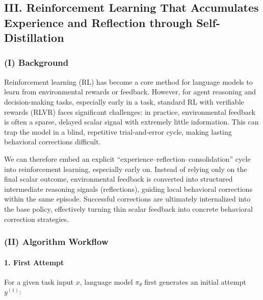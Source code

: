 \hypertarget{iii.-reinforcement-learning-that-accumulates-experience-and-reflection-through-self-distillation}{%
\subsection{III. Reinforcement Learning That Accumulates Experience and Reflection through Self-Distillation}\label{iii.-reinforcement-learning-that-accumulates-experience-and-reflection-through-self-distillation}}

\hypertarget{i-background}{%
\subsubsection{(I) Background}\label{i-background}}

Reinforcement learning (RL) has become a core method for language models to learn from environmental rewards or feedback. However, for agent reasoning and decision-making tasks, especially early in a task, standard RL with verifiable rewards (RLVR) faces significant challenges: in practice, environmental feedback is often a sparse, delayed scalar signal with extremely little information. This can trap the model in a blind, repetitive trial-and-error cycle, making lasting behavioral corrections difficult.

We can therefore embed an explicit ``experience--reflection--consolidation'' cycle into reinforcement learning, especially early on. Instead of relying only on the final scalar outcome, environmental feedback is converted into structured intermediate reasoning signals (reflections), guiding local behavioral corrections within the same episode. Successful corrections are ultimately internalized into the base policy, effectively turning thin scalar feedback into concrete behavioral correction strategies.

\hypertarget{ii-algorithm-workflow}{%
\subsubsection{(II) Algorithm Workflow}\label{ii-algorithm-workflow}}

\hypertarget{first-attempt}{%
\paragraph{1. First Attempt}\label{first-attempt}}

For a given task input \(x\), language model \(\pi_\theta\) first generates an initial attempt \(y^{(1)}\):

